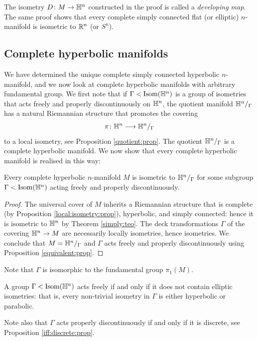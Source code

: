 The isometry $D\colon M \to \mathbb{H}^n$ constructed in the proof is called a \emph{developing map}.
The same proof shows that every complete simply connected flat (or elliptic) $n$-manifold is isometric to $\mathbb{R}^n$ (or $S^n$). 

\subsection{Complete hyperbolic manifolds}
We have determined the unique complete simply connected hyperbolic $n$-manifold, and we now look at complete hyperbolic manifolds with arbitrary fundamental group. We first note that if $\Gamma < {\rm Isom}(\mathbb{H}^n)$ is a group of isometries that acts freely and properly discontinuously on $\mathbb{H}^n$, the quotient manifold $\mathbb{H}^n/_\Gamma$ has a natural Riemannian structure that promotes the covering
$$\pi\colon\mathbb{H}^n \longrightarrow \mathbb{H}^n/_\Gamma$$
to a local isometry, see Proposition \ref{quotient:prop}. The quotient $\mathbb{H}^n/_\Gamma$ is a complete hyperbolic manifold. 
We now show that every complete hyperbolic manifold is realised in this way:

\begin{prop} \label{corto:prop}
Every complete hyperbolic $n$-manifold $M$ is isometric to $\mathbb{H}^n/_\Gamma$ for some subgroup $\Gamma<{\rm Isom}(\mathbb{H}^n)$ acting freely and properly discontinuously.
\end{prop}
\begin{proof}
The universal cover of $M$ inherits a Riemannian structure that is complete (by Proposition \ref{local:isometry:prop}), hyperbolic, and simply connected: hence it is isometric to $\mathbb{H}^n$ by Theorem \ref{simply:teo}. The deck transformations $\Gamma$ of the covering $\mathbb{H}^n\to M$ are necessarily locally isometries, hence isometries. We conclude that $M=\mathbb{H}^n/_\Gamma$ and $\Gamma$ acts freely and properly discontinuously using Proposition \ref{equivalent:prop}.
\end{proof}

Note that $\Gamma$ is isomorphic to the fundamental group $\pi_1(M)$.

\begin{oss}
A group $\Gamma<{\rm Isom}(\mathbb{H}^n)$ acts freely if and only if it does not contain elliptic isometries: that is, every non-trivial isometry in $\Gamma$ is either hyperbolic or parabolic.
\end{oss}
Note also that $\Gamma$ acts properly discontinuously if and only if it is discrete, see Proposition \ref{iff:discrete:prop}. 

